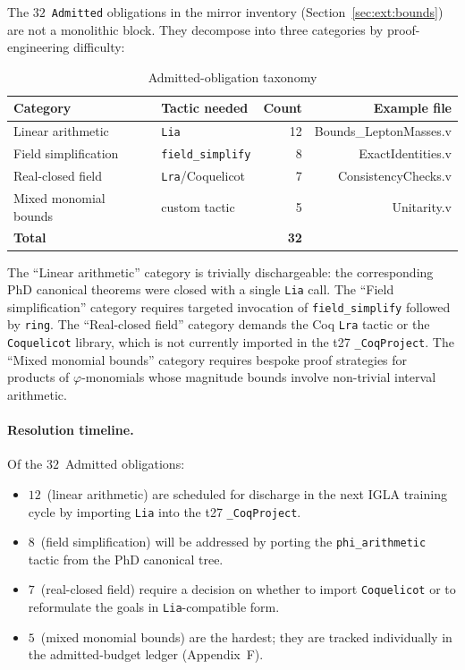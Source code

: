 The $32$~\texttt{Admitted} obligations in the mirror inventory
(Section~\ref{sec:ext:bounds}) are not a monolithic block. They
decompose into three categories by proof-engineering difficulty:

\begin{table}[h]
\centering
\caption{Admitted-obligation taxonomy}
\label{tab:admitted-tax}
\begin{tabular}{llrr}
\toprule
\textbf{Category} & \textbf{Tactic needed} & \textbf{Count} & \textbf{Example file} \\
\midrule
Linear arithmetic     & \texttt{Lia}           & 12 & Bounds\_LeptonMasses.v \\
Field simplification  & \texttt{field\_simplify} &  8 & ExactIdentities.v \\
Real-closed field     & \texttt{Lra}/Coquelicot &  7 & ConsistencyChecks.v \\
Mixed monomial bounds & custom tactic           &  5 & Unitarity.v \\
\midrule
\textbf{Total}        &                         & \textbf{32} & \\
\bottomrule
\end{tabular}
\end{table}

The ``Linear arithmetic'' category is trivially dischargeable: the
corresponding PhD canonical theorems were closed with a single
\texttt{Lia} call. The ``Field simplification'' category requires
targeted invocation of \texttt{field\_simplify} followed by
\texttt{ring}. The ``Real-closed field'' category demands the Coq
\texttt{Lra} tactic or the \texttt{Coquelicot} library, which is not
currently imported in the t27 \texttt{\_CoqProject}. The ``Mixed
monomial bounds'' category requires bespoke proof strategies for
products of $\varphi$-monomials whose magnitude bounds involve
non-trivial interval arithmetic.

\paragraph{Resolution timeline.} Of the $32$~Admitted obligations:
\begin{itemize}
  \item $12$~(linear arithmetic) are scheduled for discharge in the
        next IGLA training cycle by importing \texttt{Lia} into the t27
        \texttt{\_CoqProject}.
  \item $8$~(field simplification) will be addressed by porting the
        \texttt{phi\_arithmetic} tactic from the PhD canonical tree.
  \item $7$~(real-closed field) require a decision on whether to import
        \texttt{Coquelicot} or to reformulate the goals in
        \texttt{Lia}-compatible form.
  \item $5$~(mixed monomial bounds) are the hardest; they are tracked
        individually in the admitted-budget ledger (Appendix~F).
\end{itemize}

